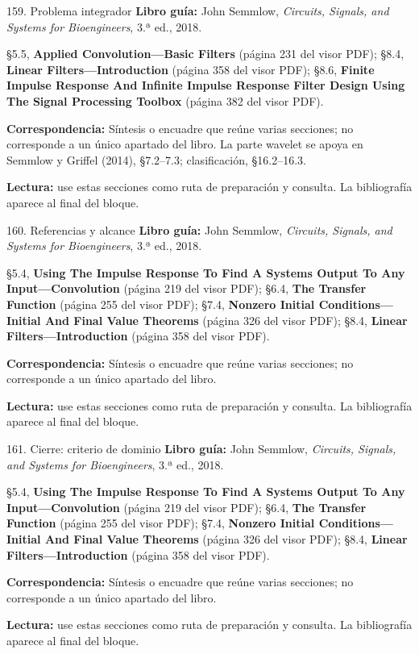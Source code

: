 \documentclass[
  10pt,
  ignorenonframetext,
  aspectratio=169,
  spanish,
]{beamer}
\begin{document}
\begin{frame}{159. Problema integrador}
\label{problema-integrador}
\textbf{Libro guía:} John Semmlow, \emph{Circuits, Signals, and Systems
for Bioengineers}, 3.ª ed., 2018.

§5.5, \textbf{Applied Convolution---Basic Filters} (página 231 del visor
PDF); §8.4, \textbf{Linear Filters---Introduction} (página 358 del visor
PDF); §8.6, \textbf{Finite Impulse Response And Infinite Impulse
Response Filter Design Using The Signal Processing Toolbox} (página 382
del visor PDF).

\textbf{Correspondencia:} Síntesis o encuadre que reúne varias
secciones; no corresponde a un único apartado del libro. La parte
wavelet se apoya en Semmlow y Griffel (2014), §7.2--7.3; clasificación,
§16.2--16.3.

\textbf{Lectura:} use estas secciones como ruta de preparación y
consulta. La bibliografía aparece al final del bloque.
\end{frame}

\begin{frame}{160. Referencias y alcance}
\label{referencias-y-alcance-2}
\textbf{Libro guía:} John Semmlow, \emph{Circuits, Signals, and Systems
for Bioengineers}, 3.ª ed., 2018.

§5.4, \textbf{Using The Impulse Response To Find A Systems Output To Any
Input---Convolution} (página 219 del visor PDF); §6.4, \textbf{The
Transfer Function} (página 255 del visor PDF); §7.4, \textbf{Nonzero
Initial Conditions---Initial And Final Value Theorems} (página 326 del
visor PDF); §8.4, \textbf{Linear Filters---Introduction} (página 358 del
visor PDF).

\textbf{Correspondencia:} Síntesis o encuadre que reúne varias
secciones; no corresponde a un único apartado del libro.

\textbf{Lectura:} use estas secciones como ruta de preparación y
consulta. La bibliografía aparece al final del bloque.
\end{frame}

\begin{frame}{161. Cierre: criterio de dominio}
\label{cierre-criterio-de-dominio-2}
\textbf{Libro guía:} John Semmlow, \emph{Circuits, Signals, and Systems
for Bioengineers}, 3.ª ed., 2018.

§5.4, \textbf{Using The Impulse Response To Find A Systems Output To Any
Input---Convolution} (página 219 del visor PDF); §6.4, \textbf{The
Transfer Function} (página 255 del visor PDF); §7.4, \textbf{Nonzero
Initial Conditions---Initial And Final Value Theorems} (página 326 del
visor PDF); §8.4, \textbf{Linear Filters---Introduction} (página 358 del
visor PDF).

\textbf{Correspondencia:} Síntesis o encuadre que reúne varias
secciones; no corresponde a un único apartado del libro.

\textbf{Lectura:} use estas secciones como ruta de preparación y
consulta. La bibliografía aparece al final del bloque.
\end{frame}
\end{document}
